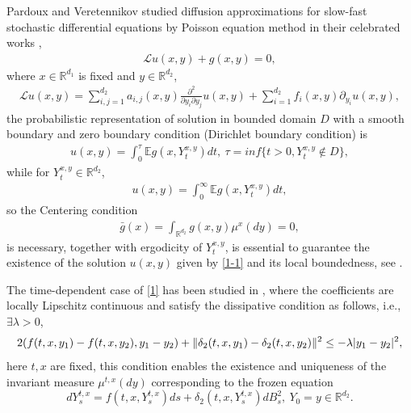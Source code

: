 \documentclass[11pt,reqno]{amsart}
\numberwithin{equation}{section}
\begin{document}
Pardoux and Veretennikov studied diffusion approximations for slow-fast stochastic differential equations by Poisson equation method in their celebrated works \cite{EY1,EY2,EY3}, 
\begin{equation}
	\begin{aligned}
\mathcal{L}u(x,y)+g(x,y)=0,
	\end{aligned}\nonumber
\end{equation}
where $x\in \mathbb{R}^{d_{1}}$ is fixed and $y\in \mathbb{R}^{d_{2}}$,
\begin{equation}
	\begin{aligned}		
		\mathcal{L}u(x,y)=\sum_{i,j=1}^{d_{2}}a_{i,j}(x,y)\frac{\partial^{2}}{\partial y_{i}\partial y_{j}}u(x,y)+\sum_{i=1}^{d_{2}}f_{i}(x,y)\partial _{y_{i}}u(x,y), 
	\end{aligned}\nonumber
\end{equation}
  the probabilistic representation of solution in bounded domain $D$ with a smooth boundary and zero boundary condition (Dirichlet boundary condition) is 
\begin{equation}
	\begin{aligned}
	u(x,y)=\int_{0}^{\tau}\mathbb{E}g(x,Y_{t}^{x,y})dt,\ \tau=inf\{t>0, Y_{t}^{x,y}\notin D\},
	\end{aligned}\nonumber
\end{equation}
while for $Y_{t}^{x,y} \in \mathbb{R}^{d_{2}}$, 
\begin{equation}\label{1-1}
	\begin{aligned}
		u(x,y)=\int_{0}^{\infty}\mathbb{E}g(x,Y_{t}^{x,y})dt,
	\end{aligned}
\end{equation}
so the Centering condition 
\begin{equation}\label{1-2}
	\begin{aligned}
		\bar{g}(x)=\int_{\mathbb{R}^{d_{2}}}g(x,y)\mu^{x}(dy)=0,
		\end{aligned}\nonumber
	\end{equation}
 is necessary, together with ergodicity of $Y_{t}^{x,y}$, is essential to guarantee the existence of the solution $u(x,y)$ given by \eqref{1-1} and its local boundedness, see \cite[Theorem 1]{EY1}.
 
 
The time-dependent case of \eqref{1} has been studied in \cite{LRSX}, where the coefficients are locally Lipschitz continuous and satisfy the dissipative condition as follows, i.e.,  $\exists \lambda>0$, 
$$
		2( f(t,x,y_{1})-f(t,x,y_{2}),y_{1}-y_{2})  +\Arrowvert\delta_{2}(t,x,y_{1})-\delta_{2}(t,x,y_{2})\Arrowvert^{2}\leq-\lambda|y_{1}-y_{2}|^{2},
$$
here $t,x$ are fixed, this condition enables the existence and uniqueness of the invariant measure $\mu^{t,x}(dy)$ corresponding to the frozen equation 
$$
	dY^{t,x}_{s}=f(t,x,Y^{t,x}_{s})ds+\delta_{2}(t,x,Y^{t,x}_{s})dB^{2}_{s},\ Y_{0}=y\in \mathbb{R}^{d_{2} }.
$$
\end{document}

